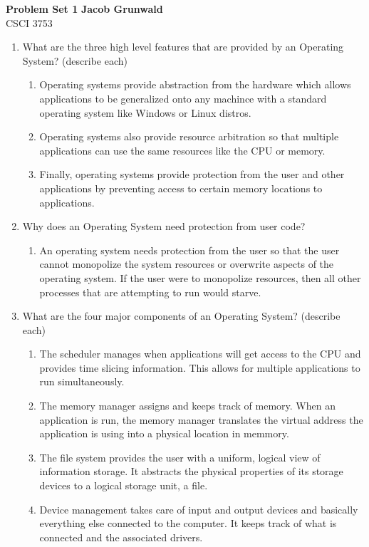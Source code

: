 \documentclass[a4paper, 11pt]{article}
\begin{document}
\noindent
\large\textbf{Problem Set 1} \hfill \textbf{Jacob Grunwald} \\
\normalsize CSCI 3753 \hfill

\begin{enumerate}
  \item What are the three high level features that are provided by an Operating System? (describe each)
  \begin{enumerate}
    \item Operating systems provide abstraction from the hardware which allows applications to be generalized onto any machince with a standard operating system like Windows or Linux distros.
    \item Operating systems also provide resource arbitration so that multiple applications can use the same resources like the CPU or memory.
    \item Finally, operating systems provide protection from the user and other applications by preventing access to certain memory locations to applications.
  \end{enumerate}
  \item Why does an Operating System need protection from user code?
  \begin{enumerate}
    \item An operating system needs protection from the user so that the user cannot monopolize the system resources or overwrite aspects of the operating system. If the user were to monopolize resources, then all other processes that are attempting to run would starve.
  \end{enumerate}
  \item What are the four major components of an Operating System? (describe each)
  \begin{enumerate}
    \item The scheduler manages when applications will get access to the CPU and provides time slicing information. This allows for multiple applications to run simultaneously.
    \item The memory manager assigns and keeps track of memory. When an application is run, the memory manager translates the virtual address the application is using into a physical location in memmory.
    \item The file system provides the user with a uniform, logical view of information storage. It abstracts the physical properties of its storage devices to a logical storage unit, a file.
    \item Device management takes care of input and output devices and basically everything else connected to the computer. It keeps track of what is connected and the associated drivers.

\end{enumerate}
\end{enumerate}
\end{document}
